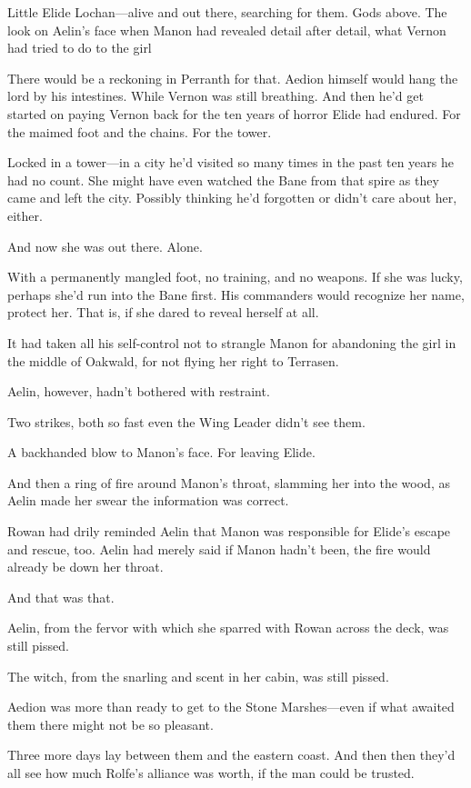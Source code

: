 Little Elide Lochan---alive and out there, searching for them.
Gods above.
The look on Aelin's face when Manon had revealed detail after detail, what Vernon had tried to do to the girl 

There would be a reckoning in Perranth for that.
Aedion himself would hang the lord by his intestines.
While Vernon was still breathing.
And then he'd get started on paying Vernon back for the ten years of horror Elide had endured.
For the maimed foot and the chains.
For the tower.

Locked in a tower---in a city he'd visited so many times in the past ten years he had no count.
She might have even watched the Bane from that spire as they came and left the city.
Possibly thinking he'd forgotten or didn't care about her, either.

And now she was out there.
Alone.

With a permanently mangled foot, no training, and no weapons.
If she was lucky, perhaps she'd run into the Bane first.
His commanders would recognize her name, protect her.
That is, if she dared to reveal herself at all.

It had taken all his self-control not to strangle Manon for abandoning the girl in the middle of Oakwald, for not flying her right to Terrasen.

Aelin, however, hadn't bothered with restraint.

Two strikes, both so fast even the Wing Leader didn't see them.

A backhanded blow to Manon's face.
For leaving Elide.

And then a ring of fire around Manon's throat, slamming her into the wood, as Aelin made her swear the information was correct.

Rowan had drily reminded Aelin that Manon was responsible for Elide's escape and rescue, too.
Aelin had merely said if Manon hadn't been, the fire would already be down her throat.

And that was that.

Aelin, from the fervor with which she sparred with Rowan across the deck, was still pissed.

The witch, from the snarling and scent in her cabin, was still pissed.

Aedion was more than ready to get to the Stone Marshes---even if what awaited them there might not be so pleasant.

Three more days lay between them and the eastern coast.
And then  then they'd all see how much Rolfe's alliance was worth, if the man could be trusted.

